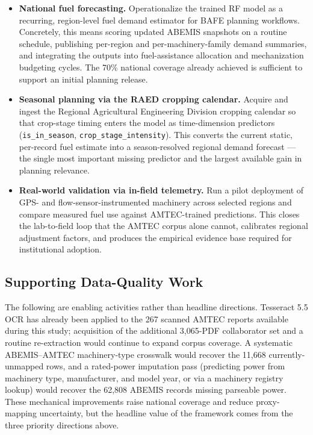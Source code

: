 \documentclass[conference]{IEEEtran}
\begin{document}
\begin{itemize}
  \item \textbf{National fuel forecasting.} Operationalize the trained RF model as a recurring, region-level fuel demand estimator for BAFE planning workflows. Concretely, this means scoring updated ABEMIS snapshots on a routine schedule, publishing per-region and per-machinery-family demand summaries, and integrating the outputs into fuel-assistance allocation and mechanization budgeting cycles. The 70\% national coverage already achieved is sufficient to support an initial planning release.

  \item \textbf{Seasonal planning via the RAED cropping calendar.} Acquire and ingest the Regional Agricultural Engineering Division cropping calendar so that crop-stage timing enters the model as time-dimension predictors (\texttt{is\_in\_season}, \texttt{crop\_stage\_intensity}). This converts the current static, per-record fuel estimate into a season-resolved regional demand forecast --- the single most important missing predictor and the largest available gain in planning relevance.

  \item \textbf{Real-world validation via in-field telemetry.} Run a pilot deployment of GPS- and flow-sensor-instrumented machinery across selected regions and compare measured fuel use against AMTEC-trained predictions. This closes the lab-to-field loop that the AMTEC corpus alone cannot, calibrates regional adjustment factors, and produces the empirical evidence base required for institutional adoption.
\end{itemize}

\subsection{Supporting Data-Quality Work}

The following are enabling activities rather than headline directions. Tesseract 5.5 OCR has already been applied to the 267 scanned AMTEC reports available during this study; acquisition of the additional 3{,}065-PDF collaborator set and a routine re-extraction would continue to expand corpus coverage. A systematic ABEMIS--AMTEC machinery-type crosswalk would recover the 11{,}668 currently-unmapped rows, and a rated-power imputation pass (predicting power from machinery type, manufacturer, and model year, or via a machinery registry lookup) would recover the 62{,}808 ABEMIS records missing parseable power. These mechanical improvements raise national coverage and reduce proxy-mapping uncertainty, but the headline value of the framework comes from the three priority directions above.
\end{document}
